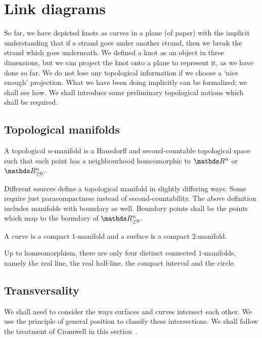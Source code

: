 \section{Link diagrams}

So far, we have depicted knots as curves in a plane (of paper) with the implicit understanding that if a strand goes under another strand, then we break the strand which goes underneath. We defined a knot as an object in three dimensions, but we can project the knot onto a plane to represent it, as we have done so far. We do not lose any topological information if we choose a `nice enough' projection. What we have been doing implicitly can be formalized; we shall see how. We shall introduce some preliminary topological notions which shall be required.

\subsection{Topological manifolds}

\begin{defn}
    A topological \(n\)-manifold is a Hausdorff and second-countable topological space such that each point has a neighbourhood homeomorphic to \(\R^n\) or \(\R^n_{\geq 0}\).
\end{defn}

\begin{remark}
    Different sources define a topological manifold in slightly differing ways. Some require just paracompactness instead of second-countability. The above definition includes manifolds with boundary as well. Boundary points shall be the points which map to the boundary of \(\R^n_{\geq 0}\).
\end{remark}

\begin{defn}
    A curve is a compact \(1\)-manifold and a surface is a compact \(2\)-manifold.
\end{defn}

Up to homeomorphism, there are only four distinct connected \(1\)-manifolds, namely the real line, the real half-line, the compact interval and the circle.

\subsection{Transversality}

We shall need to consider the ways surfaces and curves intersect each other. We use the principle of general position to classify these intersections. We shall follow the treatment of Cromwell in this section~\cite[chp.~2, \S~2.10]{cromwell}.


